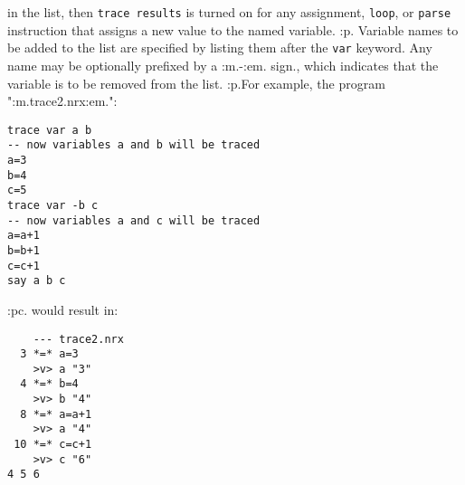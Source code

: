 in the list, then \texttt{trace results} is turned on for any
assignment, \texttt{loop}, or \texttt{parse} instruction that assigns a
new value to the named variable.
:p.
Variable names to be added to the list are specified by listing them
after the \texttt{var} keyword.
Any name may be optionally prefixed by a :m.-:em. sign., which indicates
that the variable is to be removed from the list.
:p.For example, the program ":m.trace2.nrx:em.":
\begin{verbatim}
trace var a b
-- now variables a and b will be traced
a=3
b=4
c=5
trace var -b c
-- now variables a and c will be traced
a=a+1
b=b+1
c=c+1
say a b c
\end{verbatim}
:pc.
would result in:
\begin{verbatim}
    --- trace2.nrx
  3 *=* a=3
    >v> a "3"
  4 *=* b=4
    >v> b "4"
  8 *=* a=a+1
    >v> a "4"
 10 *=* c=c+1
    >v> c "6"
4 5 6
\end{verbatim}
